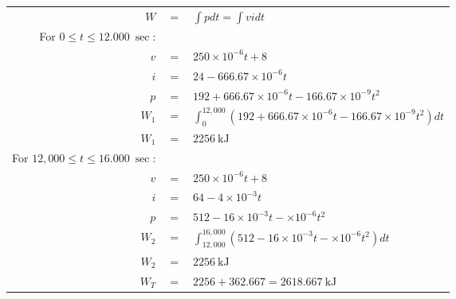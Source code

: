 \documentclass[a4paper]{article}
\begin{document}
\begin{itemize}
\begin{itemize}
	      	      \begin{tabular}{r c l}
	      	      	$W$                                         & $=$ & $\int pdt = \int vidt$                                                      \\
	      	      	For $0 \leq t \leq \SI{12,000}{\sec}$:      &     &                                                                             \\
	      	      	$v$                                         & $=$ & $250\times10^{-6}t + 8$                                                     \\
	      	      	$i$                                         & $=$ & $24 - 666.67\times10^{-6}t$                                                 \\
	      	      	$p$                                         & $=$ & $192 + 666.67\times10^{-6}t - 166.67\times10^{-9}t^{2}$                     \\
	      	      	$W_{1}$                                     & $=$ & $\int_{0}^{12,000} (192 + 666.67\times10^{-6}t - 166.67\times10^{-9}t^2)dt$ \\
	      	      	$W_{1}$                                     & $=$ & $\SI{2256}{\kilo\joule}$                                                    \\
	      	      	For $12,000 \leq t \leq \SI{16,000}{\sec}$: &     &                                                                             \\
	      	      	$v$                                         & $=$ & $250\times10^{-6}t + 8$                                                     \\
	      	      	$i$                                         & $=$ & $64 - 4\times10^{-3}t$                                                      \\
	      	      	$p$                                         & $=$ & $512 - 16\times10^{-3}t - \times10^{-6}t^{2}$                               \\
	      	      	$W_{2}$                                     & $=$ & $\int_{12,000}^{16,000} (512 - 16\times10^{-3}t - \times10^{-6}t^{2})dt$    \\
	      	      	$W_{2}$                                     & $=$ & $\SI{2256}{\kilo\joule}$                                                    \\
	      	      	$W_{T}$                                     & $=$ & $2256 + 362.667 = \SI{2618.667}{\kilo\joule}$                               \\

\end{tabular}
\end{itemize}
\end{itemize}
\end{document}
